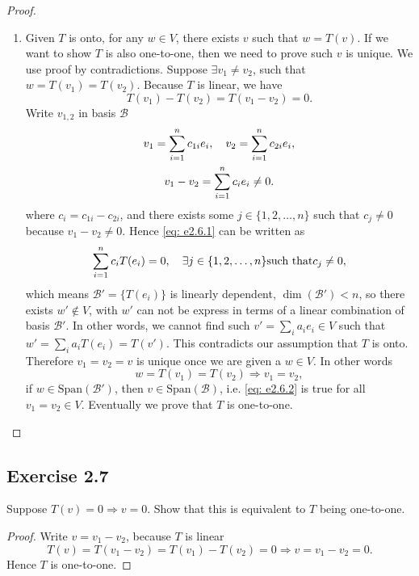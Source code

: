 \documentclass[10pt]{article}
\begin{document}
\begin{proof}
\begin{enumerate}
		\item Given $T$ is onto, for any $w \in V$, there exists $v$ such that $w = T(v)$. If we want to show $T$ is also one-to-one, then we need to prove such $v$ is unique. We use proof by contradictions. Suppose $\exists v_1 \neq v_2$, such that $w = T(v_1) = T(v_2)$. Because $T$ is linear, we have
		\begin{equation}
			T(v_1) - T(v_2) = T(v_1 - v_2) = 0. \label{eq: e2.6.1}
		\end{equation}
		Write $v_{1,2}$ in basis $\mathcal{B}$
		\begin{gather*}
			v_1 = \sum_{i=1}^n c_{1i} e_i\qc v_2 = \sum_{i=1}^n c_{2i} e_i, \\
			v_1 - v_2 = \sum_{i=1}^n c_{i} e_i \neq 0.
		\end{gather*}
		where $c_i = c_{1i} - c_{2i}$, and there exists some $j \in \{1,2,\dots,n\}$ such that $c_j \neq 0$ because $v_1 - v_2 \neq 0$. Hence \eqref{eq: e2.6.1} can be written as
		\begin{equation}
			\sum_{i=1}^n c_i T(e_i) = 0\qc \exists j \in \{1,2,\dots,n\} \text{such that} c_j \neq 0,
		\end{equation}
		which means $\mathcal{B'}=\{T(e_i)\}$ is linearly dependent, $\dim(\mathcal{B'}) < n$, so there exists $w' \notin V$, with $w'$ can not be express in terms of a linear combination of basis $\mathcal{B'}$. In other words, we cannot find such $v' = \sum_i a_i e_i \in V$ such that $w' = \sum_i a_i T(e_i) = T(v')$. This contradicts our assumption that $T$ is onto. Therefore $v_1 = v_2 = v$ is unique once we are given a $w \in V$. In other words
		\begin{equation}
			w = T(v_1) = T(v_2) \Longrightarrow v_1 = v_2, \label{eq: e2.6.2}
		\end{equation}
		if $w \in \mathrm{Span}(\mathcal{B'})$, then $v \in \mathrm{Span}(\mathcal{B})$, i.e. \eqref{eq: e2.6.2} is true for all $v_1 = v_2 \in V$. Eventually we prove that $T$ is one-to-one.
	\end{enumerate}
\end{proof}

\subsection{Exercise 2.7}
Suppose $T(v) = 0 \Longrightarrow v = 0$. Show that this is equivalent to $T$ being one-to-one.

\begin{proof}
	Write $v = v_1 - v_2$, because $T$ is linear
	\begin{equation}
		T(v) = T(v_1 - v_2) = T(v_1) - T(v_2) = 0 \Longrightarrow v = v_1 - v_2 =0.
	\end{equation}
	Hence $T$ is one-to-one.
\end{proof}
\end{document}
